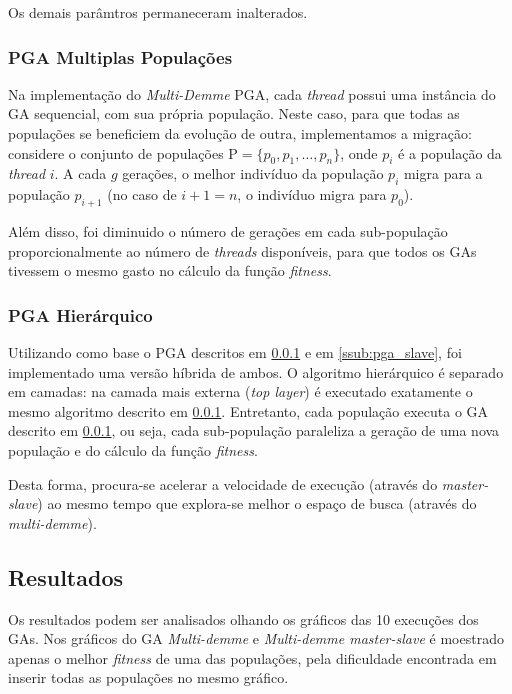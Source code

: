 \documentclass[12pt]{article}
\begin{document}
Os demais parâmtros permaneceram inalterados.


\subsubsection{PGA Multiplas Populações} %
\label{ssub:pga_mp}

Na implementação do \emph{Multi-Demme} PGA, cada \emph{thread} possui uma instância do GA sequencial, com sua própria população. Neste caso, para que todas as populações se beneficiem da evolução de outra, implementamos a migração: considere o conjunto de populações $\mathrm{P} = \lbrace p_0, p_1, \dots, p_n \rbrace$, onde $p_i$ é a população da \emph{thread} $i$. A cada $g$ gerações, o melhor indivíduo da população $p_i$ migra para a população $p_{i+1}$ (no caso de $i+1 = n$, o indivíduo migra para $p_0$).

Além disso, foi diminuido o número de gerações em cada sub-população proporcionalmente ao número de \emph{threads} disponíveis, para que todos os GAs tivessem o mesmo gasto no cálculo da função \emph{fitness}.


\subsubsection{PGA Hierárquico} %
\label{ssub:pga_h}

Utilizando como base o PGA descritos em \ref{ssub:pga_mp} e em \ref{ssub:pga_slave}, foi implementado uma versão híbrida de ambos. O algoritmo hierárquico é separado em camadas: na camada mais externa (\emph{top layer}) é executado exatamente o mesmo algoritmo descrito em \ref{ssub:pga_mp}. Entretanto, cada população executa o GA descrito em \ref{ssub:pga_mp}, ou seja, cada sub-população paraleliza a geração de uma nova população e do cálculo da função \emph{fitness}.

Desta forma, procura-se acelerar a velocidade de execução (através do \emph{master-slave}) ao mesmo tempo que explora-se melhor o espaço de busca (através do \emph{multi-demme}).

\subsection{Resultados} %
\label{sub:resultados}

Os resultados podem ser analisados olhando os gráficos das 10 execuções dos GAs. Nos gráficos do GA \emph{Multi-demme} e \emph{Multi-demme master-slave} é moestrado apenas o melhor \emph{fitness} de uma das populações, pela dificuldade encontrada em inserir todas as populações no mesmo gráfico.
\end{document}

